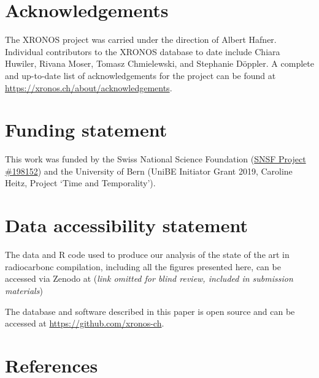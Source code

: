 \documentclass[
  number,
  review]{elsarticle}
\begin{document}
\section{Acknowledgements}\label{acknowledgements}

The XRONOS project was carried under the direction of Albert Hafner.
Individual contributors to the XRONOS database to date include Chiara
Huwiler, Rivana Moser, Tomasz Chmielewski, and Stephanie Döppler. A
complete and up-to-date list of acknowledgements for the project can be
found at \url{https://xronos.ch/about/acknowledgements}.

\section{Funding statement}\label{funding-statement}

This work was funded by the Swiss National Science Foundation
(\href{https://data.snf.ch/grants/grant/198153}{SNSF Project \#198152})
and the University of Bern (UniBE Initiator Grant 2019, Caroline Heitz,
Project `Time and Temporality').

\section{Data accessibility
statement}\label{data-accessibility-statement}

The data and R code used to produce our analysis of the state of the art
in radiocarbonc compilation, including all the figures presented here,
can be accessed via Zenodo at (\emph{link omitted for blind review,
included in submission materials})

The database and software described in this paper is open source and can
be accessed at \url{https://github.com/xronos-ch}.

\section*{References}\label{references}
\end{document}
